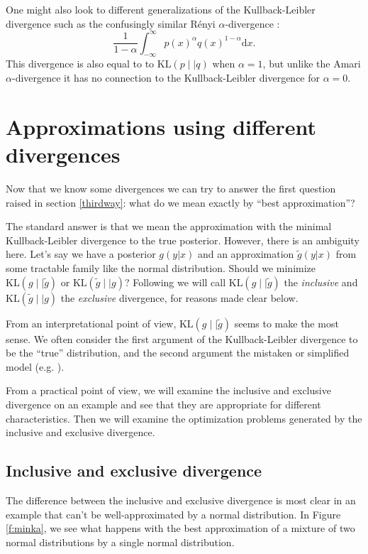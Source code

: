 \documentclass[12pt,vu]{adammath}
\newcommand\kl[2]{{\text{KL}({#1} \mid\mid {#2})}}
\theoremstyle{plain}
\theoremstyle{definition}
\theoremstyle{remark}
\begin{document}
One might also look to different generalizations of the Kullback-Leibler divergence such as the confusingly similar Rényi $\alpha$-divergence \cite{renyi}:
$$\frac{1}{1-\alpha} \int_{-\infty}^{\infty} p(x)^{\alpha} q(x)^{1-\alpha} \mathrm{d}x.$$
This divergence is also equal to to $\kl{p}{q}$ when $\alpha = 1$, but unlike the Amari $\alpha$-divergence it has no connection to the Kullback-Leibler divergence for $\alpha = 0$.

\chapter{Approximations using different divergences}\label{optimizing}
Now that we know some divergences we can try to answer the first question raised in section \ref{thirdway}:
what do we mean exactly by ``best approximation''?

The standard answer is that we mean the approximation with the minimal Kullback-Leibler divergence to the true posterior.
However, there is an ambiguity here.
Let's say we have a posterior $g(y | x)$ and an approximation $\tilde{g}(y | x)$ from some tractable family like the normal distribution.
Should we minimize $\kl{g}{\tilde{g}}$ or $\kl{\tilde{g}}{g}$?
Following \cite{minkadiv} we will call $\kl{g}{\tilde{g}}$ the \emph{inclusive} and $\kl{\tilde{g}}{g}$ the \emph{exclusive} divergence, for reasons made clear below.

From an interpretational point of view, $\kl{g}{\tilde{g}}$ seems to make the most sense.
We often consider the first argument of the Kullback-Leibler divergence to be the ``true'' distribution, and the second argument the mistaken or simplified model (e.g. \cite{infcrit}).

From a practical point of view, we will examine the inclusive and exclusive divergence on an example and see that they are appropriate for different characteristics.
Then we will examine the optimization problems generated by the inclusive and exclusive divergence.

\section{Inclusive and exclusive divergence}\label{incexc}
The difference between the inclusive and exclusive divergence is most clear in an example that can't be well-approximated by a normal distribution.
In Figure \ref{f:minka}, we see what happens with the best approximation of a mixture of two normal distributions by a single normal distribution.
\end{document}
